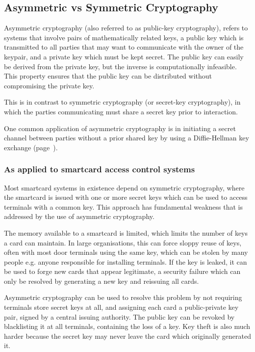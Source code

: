 \documentclass[12pt,a4paper]{article}
\begin{document}


\subsection{Asymmetric vs Symmetric Cryptography}
Asymmetric cryptography (also referred to as public-key cryptography), refers to systems that involve pairs of mathematically related keys, a public key which is transmitted to all parties that may want to communicate with the owner of the keypair, and a private key which must be kept secret. The public key can easily be derived from the private key, but the inverse is computationally infeasible. This property ensures that the public key can be distributed without compromising the private key.

This is in contrast to symmetric cryptography (or secret-key cryptography), in which the parties communicating must share a secret key prior to interaction.

One common application of asymmetric cryptography is in initiating a secret channel between parties without a prior shared key by using a Diffie-Hellman key exchange (page~\pageref{subsec:diffie_hellman}).

\subsubsection{As applied to smartcard access control systems}
\label{subsec:asymmetric_smartcards}

Most smartcard systems in existence depend on symmetric cryptography, where the smartcard is issued with one or more secret keys which can be used to access terminals with a common key. This approach has fundamental weakness that is addressed by the use of asymmetric cryptography.

The memory available to a smartcard is limited, which limits the number of keys a card can maintain. In large organisations, this can force sloppy reuse of keys, often with most door terminals using the same key, which can be stolen by many people e.g. anyone responsible for installing terminals. If the key is leaked, it can be used to forge new cards that appear legitimate, a security failure which can only be resolved by generating a new key and reissuing all cards.

Asymmetric cryptography can be used to resolve this problem by not requiring terminals store secret keys at all, and assigning each card a public-private key pair, signed by a central issuing authority. The public key can be revoked by blacklisting it at all terminals, containing the loss of a key. Key theft is also much harder because the secret key may never leave the card which originally generated it.
\end{document}
